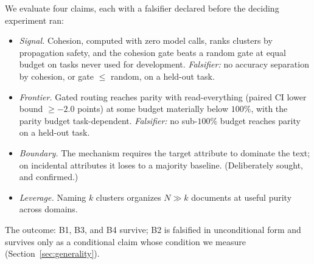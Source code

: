\documentclass[11pt]{article}
\begin{document}
We evaluate four claims, each with a falsifier declared before the deciding experiment ran:
\begin{itemize}
  \item[\textbf{B1}] \emph{Signal.} Cohesion, computed with zero model calls, ranks clusters by propagation safety, and the cohesion gate beats a random gate at equal budget on tasks never used for development. \emph{Falsifier:} no accuracy separation by cohesion, or gate $\leq$ random, on a held-out task.
  \item[\textbf{B2}] \emph{Frontier.} Gated routing reaches parity with read-everything (paired CI lower bound $\geq -2.0$ points) at some budget materially below $100\%$, with the parity budget task-dependent. \emph{Falsifier:} no sub-$100\%$ budget reaches parity on a held-out task.
  \item[\textbf{B3}] \emph{Boundary.} The mechanism requires the target attribute to dominate the text; on incidental attributes it loses to a majority baseline. (Deliberately sought, and confirmed.)
  \item[\textbf{B4}] \emph{Leverage.} Naming $k$ clusters organizes $N \gg k$ documents at useful purity across domains.
\end{itemize}
The outcome: B1, B3, and B4 survive; B2 is falsified in unconditional form and survives only as a conditional claim whose condition we measure (Section~\ref{sec:generality}).
\end{document}
